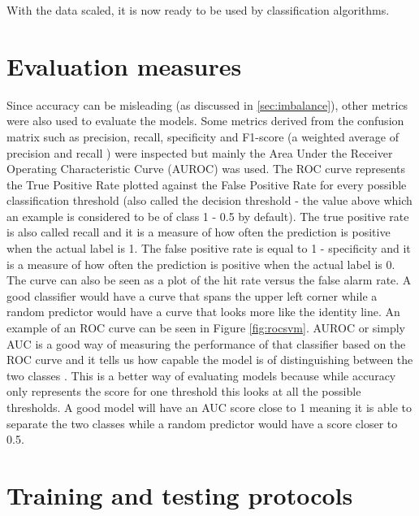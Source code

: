 With the data scaled, it is now ready to be used by classification algorithms.

\section{Evaluation measures}
\label{sec:evalation}
Since accuracy can be misleading (as discussed in \autoref{sec:imbalance}), other metrics were also used to evaluate the models. Some metrics derived from the confusion matrix such as precision, recall, specificity and F1-score (a weighted average of precision and recall \cite{sklearnm18:online}) were inspected but mainly the Area Under the Receiver Operating Characteristic Curve (AUROC) \cite{bradley1997use} \cite{fawcett2006introduction} was used. The ROC curve represents the True Positive Rate plotted against the False Positive Rate for every possible classification threshold (also called the decision threshold - the value above which an example is considered to be of class 1 - 0.5 by default). The true positive rate is also called recall and it is a measure of how often the prediction is positive when the actual label is 1. The false positive rate is equal to 1 - specificity and it is a measure of how often the prediction is positive when the actual label is 0. The curve can also be seen as a plot of the hit rate versus the false alarm rate. A good classifier would have a curve that spans the upper left corner while a random predictor would have a curve that looks more like the identity line. An example of an ROC curve can be seen in Figure \ref{fig:rocsvm}. AUROC or simply AUC is a good way of measuring the performance of that classifier based on the ROC curve and it tells us how capable the model is of distinguishing between the two classes \cite{ROCAUC:online}. This is a better way of evaluating models because while accuracy only represents the score for one threshold this looks at all the possible thresholds. A good model will have an AUC score close to 1 meaning it is able to separate the two classes while a random predictor would have a score closer to 0.5.

\section{Training and testing protocols}

